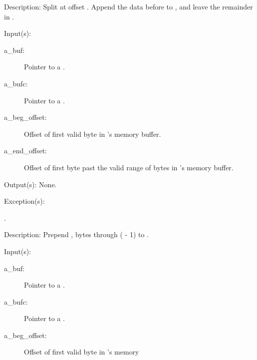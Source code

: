 \begin{capi}
\begin{capilist}
\begin{description}
		\end{description}
	\item[Description: ]
		Split  at offset .  Append the data
		before  to , and leave the remainder
		in .
	\end{capilist}
\label{buf_bufc_prepend}
	\begin{capilist}
	\item[Input(s): ]
		\begin{description}\item[]
		\item[a\_buf: ]
			Pointer to a .
		\item[a\_bufc: ]
			Pointer to a .
		\item[a\_beg\_offset: ]
			Offset of first valid byte in 's memory
			buffer.
		\item[a\_end\_offset: ]
			Offset of first byte past the valid range of bytes in
			's memory buffer.
		\end{description}
	\item[Output(s): ] None.
	\item[Exception(s): ]
		\begin{description}\item[]
		\item[.]
		\end{description}
	\item[Description: ]
		Prepend , bytes  through
		( - 1) to .
	\end{capilist}
\label{buf_bufc_append}
	\begin{capilist}
	\item[Input(s): ]
		\begin{description}\item[]
		\item[a\_buf: ]
			Pointer to a \classname{buf}.
		\item[a\_bufc: ]
			Pointer to a \classname{bufc}.
		\item[a\_beg\_offset: ]
			Offset of first valid byte in 's memory

\end{description}
\end{capilist}
\end{capi}
